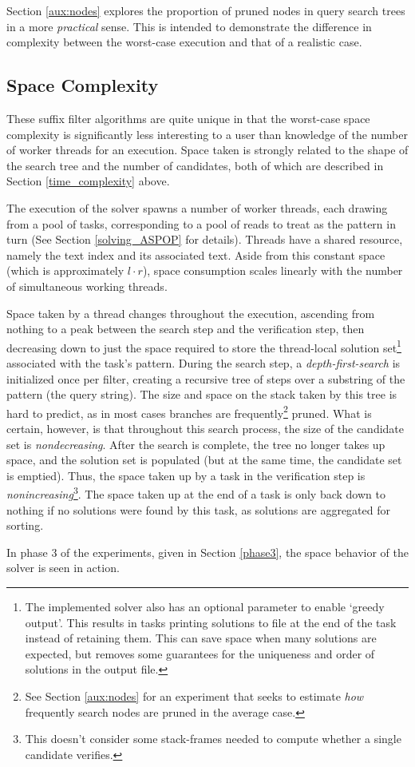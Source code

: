 Section \ref{aux:nodes} explores the proportion of pruned nodes in query search trees in a more \textit{practical} sense. This is intended to demonstrate the difference in complexity between the worst-case execution and that of a realistic case.



\subsection{Space Complexity}
\label{space_complexity}

These \gls{suffix filter} algorithms are quite unique in that the worst-case space complexity is significantly less interesting to a user than knowledge of the number of worker threads for an execution. Space taken is strongly related to the shape of the search tree and the number of \glspl{candidate}, both  of which are described in Section \ref{time_complexity} above.

The execution of the \aspop{} solver spawns a number of worker threads, each drawing from a pool of \glspl{task}, corresponding to a pool of \glspl{read} to treat as the \gls{pattern} in turn (See Section \ref{solving_ASPOP} for details). Threads have a shared resource, namely the \gls{text index} and its associated \gls{text}. Aside from this constant space (which is approximately $l \cdot{} r$), space consumption scales linearly with the number of simultaneous working threads. 

Space taken by a thread changes throughout the execution, ascending from nothing to a peak between the \gls{search step} and the \gls{verification step}, then decreasing down to just the space required to store the thread-local \gls{solution} set\footnote{The implemented \aspop{} solver also has an optional parameter to enable `greedy output'. This results in tasks printing solutions to file at the end of the task instead of retaining them. This can save space when many solutions are expected, but removes some guarantees for the uniqueness and order of solutions in the output file.} associated with the task's pattern. During the search step, a \textit{depth-first-search} is initialized once per filter, creating a recursive tree of steps over a substring of the pattern (the \gls{query} string). The size and space on the stack taken by this tree is hard to predict, as in most cases branches are frequently\footnote{See Section \ref{aux:nodes} for an experiment that seeks to estimate \textit{how} frequently search nodes are pruned in the average case.} pruned. What is certain, however, is that throughout this search process, the size of the \gls{candidate} set is \textit{nondecreasing}. After the search is complete, the tree no longer takes up space, and the \gls{solution} set is populated (but at the same time, the candidate set is emptied). Thus, the space taken up by a \gls{task} in the verification step is \textit{nonincreasing}\footnote{This doesn't consider some stack-frames needed to compute whether a single candidate verifies.}. The space taken up at the end of a task is only back down to nothing if no solutions were found by this task, as solutions are aggregated for sorting.

In phase 3 of the experiments, given in Section \ref{phase3}, the space behavior of the \aspop{} solver is seen in action.